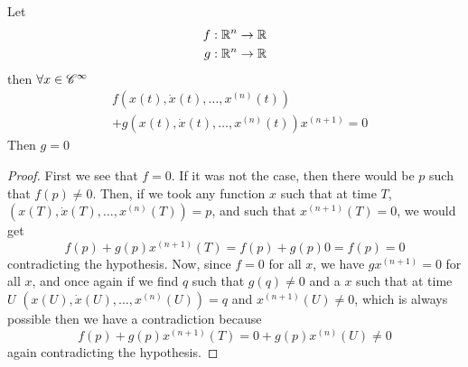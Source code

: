 \documentclass[12pt]{article}
\begin{document}
\begin{lemma} \label{affineDerZero}
  Let
  \begin{align*}
    f : \mathbb{R}^n \to \mathbb{R} \\
    g : \mathbb{R}^n \to \mathbb{R}
  \end{align*}
  then $\forall x \in \mathscr{C}^\infty$
  \begin{align*}
    &f( x(t), \dot{x}(t), \ldots, x^{(n)}(t) ) \\
    &+ g( x(t), \dot{x}(t), \ldots, x^{(n)}(t) )x^{(n+1)}
    = 0
  \end{align*}
  Then $g=0$
\end{lemma}
\begin{proof}
  First we see that $f=0$. If it was not the case, then there would be $p$ such
  that $f(p) \neq 0$. Then, if we took any function $x$ such that at time $T$,
  $(x(T), \dot{x}(T), \ldots, x^{(n)}(T))=p$, and such that $x^{(n+1)}(T) = 0$,
  we would get
  \[ f(p) + g(p)x^{(n+1)}(T) = f(p) + g(p)0 = f(p) =  0 \]
  contradicting the hypothesis.
  Now, since $f=0$ for all $x$, we have $g x^{(n+1)} = 0$ for all $x$, and once
  again if we find $q$ such that $g(q) \neq 0$ and a $x$ such that at time $U$
  $(x(U), \dot{x}(U), \ldots, x^{(n)}(U))=q$ and $x^{(n+1)}(U) \neq 0$, which is
  always possible then we have a contradiction because
  \[ f(p) + g(p)x^{(n+1)}(T) = 0 + g(p)x^{(n)}(U) \neq  0 \]
  again contradicting the hypothesis.
\end{proof}
\end{document}
